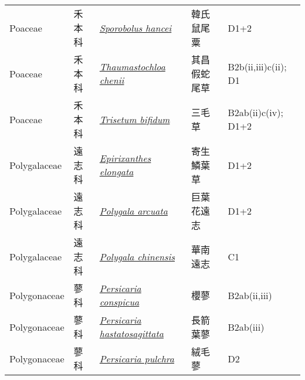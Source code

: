 {\begin{longtable}{L{2.5cm}L{2cm}L{5cm}L{2.5cm}L{3cm}}
    Poaceae & 禾本科 & \href{http://www.theplantlist.org/tpl1.1/search?q=Sporobolus+hancei}{\textit{Sporobolus hancei} } & 韓氏鼠尾粟 & D1+2    \\
    Poaceae & 禾本科 & \href{http://www.theplantlist.org/tpl1.1/search?q=Thaumastochloa+chenii}{\textit{Thaumastochloa chenii} } & 其昌假蛇尾草 & B2b(ii,iii)c(ii); D1    \\
    Poaceae & 禾本科 & \href{http://www.theplantlist.org/tpl1.1/search?q=Trisetum+bifidum}{\textit{Trisetum bifidum} } & 三毛草 & B2ab(ii)c(iv); D1+2    \\
    Polygalaceae & 遠志科 & \href{http://www.theplantlist.org/tpl1.1/search?q=Epirixanthes+elongata}{\textit{Epirixanthes elongata} } & 寄生鱗葉草 & D1+2    \\
    Polygalaceae & 遠志科 & \href{http://www.theplantlist.org/tpl1.1/search?q=Polygala+arcuata}{\textit{Polygala arcuata} } & 巨葉花遠志 & D1+2    \\
    Polygalaceae & 遠志科 & \href{http://www.theplantlist.org/tpl1.1/search?q=Polygala+chinensis}{\textit{Polygala chinensis} } & 華南遠志 & C1    \\
    Polygonaceae & 蓼科 & \href{http://www.theplantlist.org/tpl1.1/search?q=Persicaria+conspicua}{\textit{Persicaria conspicua} } & 櫻蓼 & B2ab(ii,iii)    \\
    Polygonaceae & 蓼科 & \href{http://www.theplantlist.org/tpl1.1/search?q=Persicaria+hastatosagittata}{\textit{Persicaria hastatosagittata} } & 長箭葉蓼 & B2ab(iii)    \\
    Polygonaceae & 蓼科 & \href{http://www.theplantlist.org/tpl1.1/search?q=Persicaria+pulchra}{\textit{Persicaria pulchra} } & 絨毛蓼 & D2    \\

\end{longtable}}

